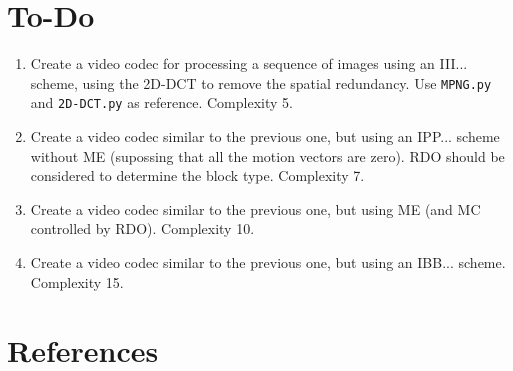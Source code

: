 \section{To-Do}

\begin{enumerate}
\item Create a video codec for processing a sequence of images using an
  III... scheme, using the 2D-DCT to remove the spatial
  redundancy. Use \texttt{MPNG.py} and \texttt{2D-DCT.py} as
  reference. Complexity 5.
\item Create a video codec similar to the previous one, but using an
  IPP... scheme without ME (supossing that all the motion vectors are
  zero). RDO should be considered to determine the block
  type. Complexity 7.
\item Create a video codec similar to the previous one, but using ME
  (and MC controlled by RDO). Complexity 10.
\item Create a video codec similar to the previous one, but using an
  IBB... scheme. Complexity 15.
\end{enumerate}

  
\section{References}

\renewcommand{\addcontentsline}[3]{}%


